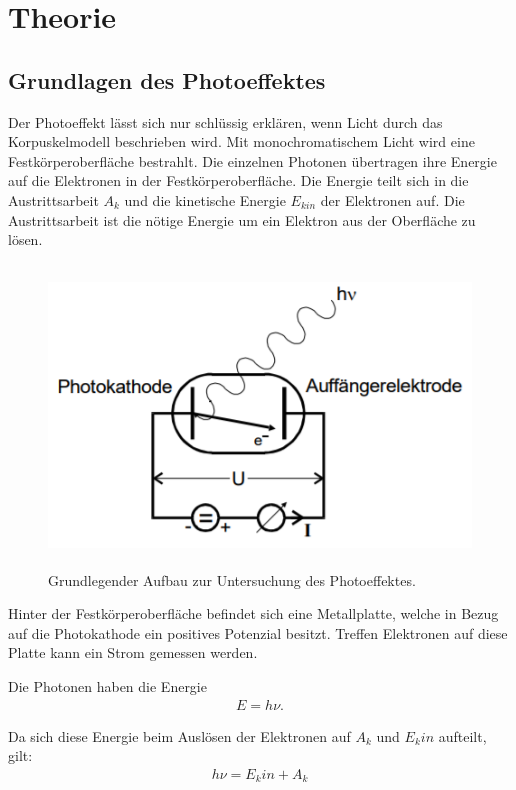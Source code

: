 \section{Theorie}
\label{sec:Theorie}

\cite{sample}

\subsection{Grundlagen des Photoeffektes}
Der Photoeffekt lässt sich nur schlüssig erklären, wenn Licht durch das Korpuskelmodell beschrieben wird.
Mit monochromatischem Licht wird eine Festkörperoberfläche bestrahlt. Die einzelnen Photonen
übertragen ihre Energie auf die Elektronen in der Festkörperoberfläche. Die Energie
teilt sich in die Austrittsarbeit $A_k$ und die kinetische Energie $E_{kin}$ der Elektronen auf.
Die Austrittsarbeit ist die nötige Energie um ein Elektron aus der Oberfläche zu lösen.

\begin{figure}[H]
  \centering
  \includegraphics[height=8cm]{anordnung.PNG}
  \caption{Grundlegender Aufbau zur Untersuchung des Photoeffektes. \cite{sample}}
  \label{fig:kathode}
\end{figure}

Hinter der Festkörperoberfläche befindet sich eine Metallplatte, welche in Bezug auf
die Photokathode ein positives Potenzial besitzt. Treffen Elektronen auf diese Platte
kann ein Strom gemessen werden.

Die Photonen haben die Energie
\begin{align}
  E = h \nu.
\end{align}

Da sich diese Energie beim Auslösen der Elektronen auf $A_k$ und $E_kin$ aufteilt, gilt:
\begin{align}
  h \nu = E_kin + A_k
\end{align}

